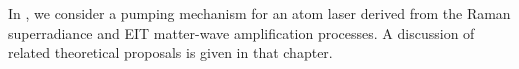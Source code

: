 In , we consider a pumping mechanism for an atom laser derived from the Raman superradiance and EIT matter-wave amplification processes.  A discussion of related theoretical proposals is given in that chapter.

% 
% 
% 
% 
% 
% 
% 
% 
% 


